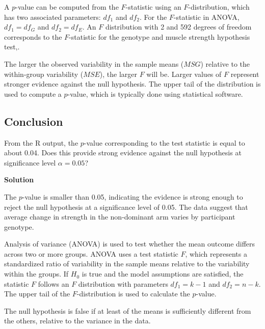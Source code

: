 \documentclass[
  letterpaper,
  DIV=11,
  numbers=noendperiod,
  oneside]{scrreprt}
\begin{document}
A \(p\)-value can be computed from the \(F\)-statistic using an
\(F\)-distribution, which has two associated parameters: \(df_{1}\) and
\(df_{2}\). For the \(F\)-statistic in ANOVA, \(df_{1} = df_{G}\) and
\(df_{2}= df_{E}\). An \(F\) distribution with 2 and 592 degrees of
freedom corresponds to the \(F\)-statistic for the genotype and muscle
strength hypothesis test,.

The larger the observed variability in the sample means (\(MSG\))
relative to the within-group variability (\(MSE\)), the larger \(F\)
will be. Larger values of \(F\) represent stronger evidence against the
null hypothesis. The upper tail of the distribution is used to compute a
\(p\)-value, which is typically done using statistical software.

\hypertarget{conclusion-3}{%
\subsection{Conclusion}\label{conclusion-3}}

From the R output, the \(p\)-value corresponding to the test statistic
is equal to about 0.04. Does this provide strong evidence against the
null hypothesis at significance level \(\alpha = 0.05\)?

\textbf{Solution}

The \(p\)-value is smaller than 0.05, indicating the evidence is strong
enough to reject the null hypothesis at a significance level of 0.05.
The data suggest that average change in strength in the non-dominant arm
varies by participant genotype.

\begin{tcolorbox}[enhanced jigsaw, toprule=.15mm, colbacktitle=quarto-callout-note-color!10!white, title=\textcolor{quarto-callout-note-color}{\faInfo}\hspace{0.5em}{The \(F\)-statistic and the \(F\)-test}, arc=.35mm, colframe=quarto-callout-note-color-frame, colback=white, titlerule=0mm, left=2mm, bottomtitle=1mm, bottomrule=.15mm, breakable, opacitybacktitle=0.6, leftrule=.75mm, toptitle=1mm, coltitle=black, rightrule=.15mm, opacityback=0]

Analysis of variance (ANOVA) is used to test whether the mean outcome
differs across two or more groups. ANOVA uses a test statistic \(F\),
which represents a standardized ratio of variability in the sample means
relative to the variability within the groups. If \(H_0\) is true and
the model assumptions are satisfied, the statistic \(F\) follows an
\(F\) distribution with parameters \(df_{1}=k-1\) and \(df_{2}=n-k\).
The upper tail of the \(F\)-distribution is used to calculate the
\(p\)-value.

The null hypothesis is false if at least of the means is sufficiently
different from the others, relative to the variance in the data.

\end{tcolorbox}
\end{document}
